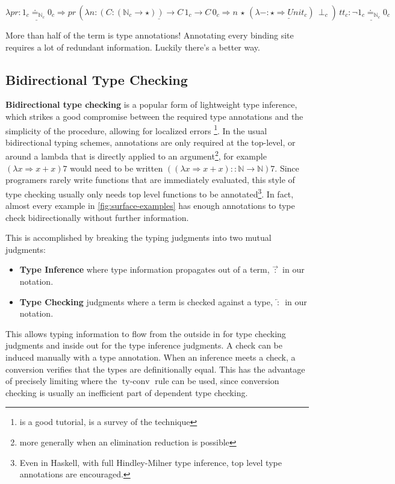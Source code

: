$\lambda pr\underline{:1_{c}\doteq_{\mathbb{N}_{c}}0_{c}}\Rightarrow pr\,\left(\lambda n:\underline{\left(C:\left(\mathbb{N}_{c}\rightarrow\star\right)\right)\rightarrow C\,1_{c}\rightarrow C\,0_{c}}\Rightarrow n\,\star\,(\lambda-:\underline{\star\Rightarrow Unit_{c}})\,\perp_{c}\right)\,tt_{c}:\underline{\lnot1_{c}\doteq_{\mathbb{N}_{c}}0_{c}}$

More than half of the term is type annotations! Annotating every binding site requires a lot of redundant information.
Luckily there's a better way.

\subsection{Bidirectional Type Checking}

\textbf{Bidirectional type checking} is a popular form of lightweight type inference, which strikes a good compromise between the required type annotations and the simplicity of the procedure, allowing for localized errors \footnote{\cite{christiansen2013bidirectional} is a good tutorial, \cite{10.1145/3450952} is a survey of the technique}.
In the usual bidirectional typing schemes, annotations are only required at the top-level, or around a lambda that is directly applied to an argument\footnote{more generally when an elimination reduction is possible}, for example $(\lambda x\Rightarrow x+x)7$ would need to be written $\left((\lambda x\Rightarrow x+x)::\mathbb{N}\rightarrow\mathbb{N}\right)7$.
Since programers rarely write functions that are immediately evaluated, this style of type checking usually only needs top level functions to be annotated\footnote{Even in Haskell, with full Hindley-Milner type inference, top level type annotations are encouraged.}.
In fact, almost every example in \ref{fig:surface-examples} has enough annotations to type check bidirectionally without further information.


This is accomplished by breaking the typing judgments into two mutual judgments:
\begin{itemize}
\item \textbf{Type Inference} where type information propagates out of a
term, $\overrightarrow{\,:\,}$ in our notation. 
\item \textbf{Type Checking} judgments where a term is checked against a
type, $\overleftarrow{\,:\,}$ in our notation. 
\end{itemize}
This allows typing information to flow from the outside in for type checking judgments and inside out for the type inference judgments.
A check can be induced manually with a type annotation.
When an inference meets a check, a conversion verifies that the types are definitionally equal.
This has the advantage of precisely limiting where the $\operatorname{ty-conv}$ rule can be used, since conversion checking is usually an inefficient part of dependent type checking.

